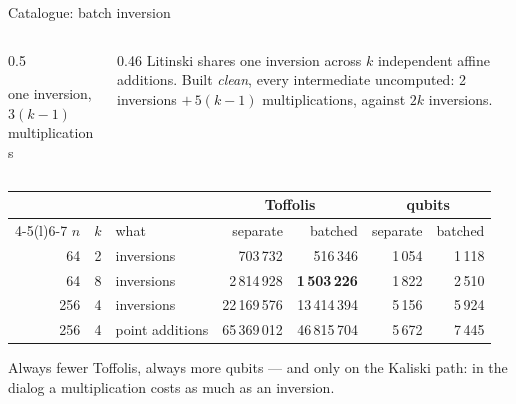 \documentclass[aspectratio=169,11pt]{beamer}
\begin{document}
\setcounter{framenumber}{201}
\begin{frame}{Catalogue: batch inversion}
  \begin{columns}[c]
    \begin{column}{0.5\textwidth}
      \centering
      \par
      {\scriptsize one inversion, $3(k-1)$ multiplications}
    \end{column}
    \begin{column}{0.46\textwidth}
      \small Litinski shares one inversion across $k$ independent affine additions. Built \emph{clean}, every intermediate uncomputed: 2 inversions $+\,5(k-1)$ multiplications, against $2k$ inversions.
    \end{column}
  \end{columns}
  \vskip2mm
  \centering\footnotesize
  \renewcommand{\arraystretch}{1.05}
  \begin{tabular}{@{}rrlrrrr@{}}
    \toprule
    & & & \multicolumn{2}{c}{Toffolis} & \multicolumn{2}{c}{qubits} \\
    \cmidrule(lr){4-5}\cmidrule(l){6-7}
    $n$ & $k$ & what & separate & batched & separate & batched \\
    \midrule
    64 & 2 & inversions & 703\,732 & 516\,346 & 1\,054 & 1\,118 \\
    64 & 8 & inversions & 2\,814\,928 & \textbf{1\,503\,226} & 1\,822 & 2\,510 \\
    256 & 4 & inversions & 22\,169\,576 & 13\,414\,394 & 5\,156 & 5\,924 \\
    256 & 4 & point additions & 65\,369\,012 & 46\,815\,704 & 5\,672 & 7\,445 \\
    \bottomrule
  \end{tabular}\par
  \vskip1mm
  \raggedright{\small Always fewer Toffolis, always more qubits --- and only on the Kaliski path: in the dialog a multiplication costs as much as an inversion.}
\end{frame}
\end{document}
